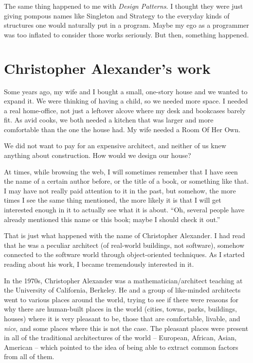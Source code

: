 The same thing happened to me with \textit{Design Patterns}. I thought they were
just giving pompous names like Singleton and Strategy to the everyday kinds of
structures one would naturally put in a program. Maybe my ego as a programmer
was too inflated to consider those works seriously. But then, something
happened.

\section*{Christopher Alexander's work}

Some years ago, my wife and I bought a small, one-story house and we wanted to
expand it. We were thinking of having a child, so we needed more space. I needed
a real home-office, not just a leftover alcove where my desk and bookcases
barely fit. As avid cooks, we both needed a kitchen that was larger and more
comfortable than the one the house had. My wife needed a Room Of Her Own.

We did not want to pay for an expensive architect, and neither of us knew
anything about construction. How would we design our house?

At times, while browsing the web, I will sometimes remember that I have seen the
name of a certain author before, or the title of a book, or something like that.
I may have not really paid attention to it in the past, but somehow, the more
times I see the same thing mentioned, the more likely it is that I will get
interested enough in it to actually see what it is about. ``Oh, several people
have already mentioned this name or this book; maybe I should check it out.''

That is just what happened with the name of Christopher Alexander. I had read
that he was a peculiar architect (of real-world buildings, not software),
somehow connected to the software world through object-oriented techniques. As I
started reading about his work, I became tremendously interested in it.

In the 1970s, Christopher Alexander was a mathematician/\discretionary{}{}{}architect teaching at
the University of California, Berkeley. He and a group of like-minded architects
went to various places around the world, trying to see if there were reasons for
why there are human-built places in the world (cities, towns, parks, buildings,
houses) where it is very pleasant to be, those that are comfortable, livable,
and \textit{nice}, and some places where this is not the case. The pleasant
places were present in all of the traditional architectures of the world --
European, African, Asian, American -- which pointed to the idea of being able to
extract common factors from all of them.

